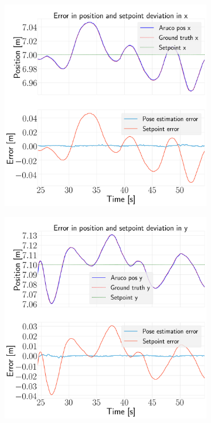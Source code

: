 \documentclass[../Head/report.tex]{subfiles}
\begin{document}
\begin{figure}[H]
    \centering
    \begin{subfigure}[t]{.30\textwidth}
        \centering
        \includegraphics[width=\textwidth]{../Figures/hold_pose_using_aruco_pose_estimation/pose_error_x_test1.png}
        \caption{}
        \label{fig:hold_pose_estimation_test5_x}
    \end{subfigure}
     \hspace{0.2em}
    \begin{subfigure}[t]{.30\textwidth}
        \centering
        \includegraphics[width=\textwidth]{../Figures/hold_pose_using_aruco_pose_estimation/pose_error_y_test1.png}

\end{subfigure}
\end{figure}
\end{document}
